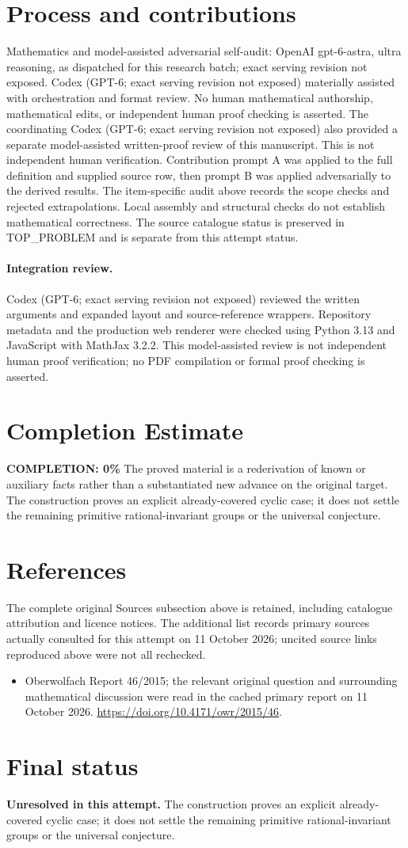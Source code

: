 \documentclass[11pt]{article}
\begin{document}
\section{Process and contributions}
Mathematics and model-assisted adversarial self-audit: OpenAI gpt-6-astra, ultra reasoning, as dispatched for this research batch; exact serving revision not exposed. Codex (GPT-6; exact serving revision not exposed) materially assisted with orchestration and format review. No human mathematical authorship, mathematical edits, or independent human proof checking is asserted.
The coordinating Codex (GPT-6; exact serving revision not exposed) also provided a separate model-assisted written-proof review of this manuscript. This is not independent human verification.
Contribution prompt A was applied to the full definition and supplied source row, then prompt B was applied adversarially to the derived results. The item-specific audit above records the scope checks and rejected extrapolations. Local assembly and structural checks do not establish mathematical correctness. The source catalogue status is preserved in TOP\_PROBLEM and is separate from this attempt status.
\paragraph{Integration review.} Codex (GPT-6; exact serving revision not exposed) reviewed the written arguments and expanded layout and source-reference wrappers. Repository metadata and the production web renderer were checked using Python 3.13 and JavaScript with MathJax 3.2.2. This model-assisted review is not independent human proof verification; no PDF compilation or formal proof checking is asserted.

\section{Completion Estimate}
\noindent\textbf{COMPLETION: 0\%}
The proved material is a rederivation of known or auxiliary facts rather than a substantiated new advance on the original target. The construction proves an explicit already-covered cyclic case; it does not settle the remaining primitive rational-invariant groups or the universal conjecture.
\section{References}
The complete original Sources subsection above is retained, including catalogue attribution and licence notices. The additional list records primary sources actually consulted for this attempt on 11 October 2026; uncited source links reproduced above were not all rechecked.
\begin{itemize}
\item Oberwolfach Report 46/2015; the relevant original question and surrounding mathematical discussion were read in the cached primary report on 11 October 2026. \url{https://doi.org/10.4171/owr/2015/46}.
\end{itemize}
\section{Final status}
\textbf{Unresolved in this attempt.} The construction proves an explicit already-covered cyclic case; it does not settle the remaining primitive rational-invariant groups or the universal conjecture.
\end{document}
